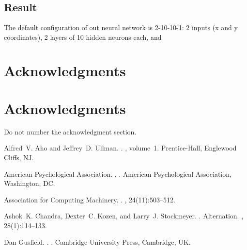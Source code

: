 \documentclass[11pt,letterpaper]{article}
\begin{document}
\subsection{Result}
The default configuration of out neural network is 2-10-10-1: 2 inputs (x and y coordinates), 2 layers of 10 hidden neurons each, and
\section*{Acknowledgments}



\section*{Acknowledgments}

Do not number the acknowledgment section.

\begin{thebibliography}{}

Alfred~V. Aho and Jeffrey~D. Ullman.
.
, volume~1.
\newblock Prentice-{Hall}, Englewood Cliffs, NJ.

{American Psychological Association}.
.
.
\newblock American Psychological Association, Washington, DC.

{Association for Computing Machinery}.
.
, 24(11):503--512.

Ashok~K. Chandra, Dexter~C. Kozen, and Larry~J. Stockmeyer.
.
\newblock Alternation.
,
  28(1):114--133.

Dan Gusfield.
.
.
\newblock Cambridge University Press, Cambridge, UK.

\end{thebibliography}
\end{document}
